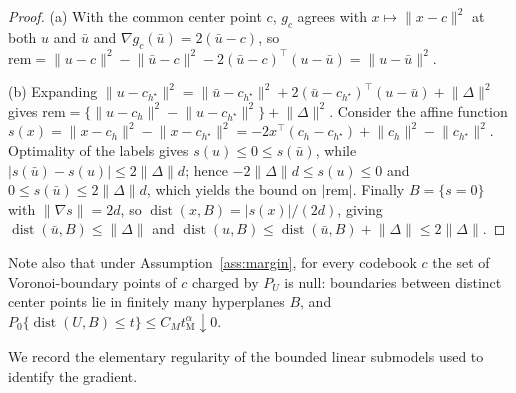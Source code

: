 \documentclass[11pt]{article}
\newcommand{\dist}{\operatorname{dist}}
\newcommand{\norm}[1]{\lVert #1\rVert}
\newcommand{\am}{\alpha_{\mathrm M}}
\begin{document}
\begin{proof}
(a) With the common center point $c$, $g_c$ agrees with $x\mapsto\norm{x-c}^2$ at both $u$ and $\bar u$ and $\nabla g_c(\bar u)=2(\bar u-c)$, so $\mathrm{rem}=\norm{u-c}^2-\norm{\bar u-c}^2-2(\bar u-c)^\top(u-\bar u)=\norm{u-\bar u}^2$.

(b) Expanding $\norm{u-c_{h^\star}}^2=\norm{\bar u-c_{h^\star}}^2+2(\bar u-c_{h^\star})^\top(u-\bar u)+\norm{\Delta}^2$ gives
$\mathrm{rem}=\bigl\{\norm{u-c_h}^2-\norm{u-c_{h^\star}}^2\bigr\}+\norm{\Delta}^2$.
Consider the affine function $s(x)=\norm{x-c_h}^2-\norm{x-c_{h^\star}}^2=-2x^\top(c_h-c_{h^\star})+\norm{c_h}^2-\norm{c_{h^\star}}^2$. Optimality of the labels gives $s(u)\le0\le s(\bar u)$, while $|s(\bar u)-s(u)|\le2\norm{\Delta} d$; hence $-2\norm{\Delta} d\le s(u)\le0$ and $0\le s(\bar u)\le2\norm{\Delta} d$, which yields the bound on $|\mathrm{rem}|$. Finally $B=\{s=0\}$ with $\norm{\nabla s}=2d$, so $\dist(x,B)=|s(x)|/(2d)$, giving $\dist(\bar u,B)\le\norm{\Delta}$ and $\dist(u,B)\le\dist(\bar u,B)+\norm{\Delta}\le2\norm{\Delta}$.
\end{proof}

Note also that under Assumption~\ref{ass:margin}, for every codebook $c$ the set of Voronoi-boundary points of $c$ charged by $P_U$ is null: boundaries between distinct center points lie in finitely many hyperplanes $B$, and $P_0\{\dist(U,B)\le t\}\le C_Mt^\am \downarrow0$.

We record the elementary regularity of the bounded linear submodels used to identify the gradient.
\end{document}
